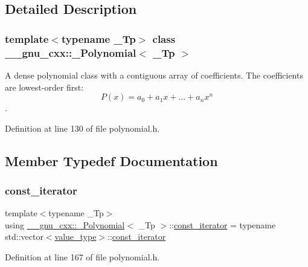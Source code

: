 \subsection{Detailed Description}
\subsubsection*{template$<$typename \+\_\+\+Tp$>$\newline
class \+\_\+\+\_\+gnu\+\_\+cxx\+::\+\_\+\+Polynomial$<$ \+\_\+\+Tp $>$}

A dense polynomial class with a contiguous array of coefficients. The coefficients are lowest-\/order first\+: \[ P(x) = a_0 + a_1 x + ... + a_n x^n \]. 

Definition at line 130 of file polynomial.\+h.



\subsection{Member Typedef Documentation}
\mbox{\label{class____gnu__cxx_1_1__Polynomial_a96e4523cc2a834724fe4224f0800486b}} 
\subsubsection{\texorpdfstring{const\+\_\+iterator}{const\_iterator}}
{\footnotesize\ttfamily template$<$typename \+\_\+\+Tp$>$ \\
using \hyperlink{class____gnu__cxx_1_1__Polynomial}{\+\_\+\+\_\+gnu\+\_\+cxx\+::\+\_\+\+Polynomial}$<$ \+\_\+\+Tp $>$\+::\hyperlink{class____gnu__cxx_1_1__Polynomial_a96e4523cc2a834724fe4224f0800486b}{const\+\_\+iterator} =  typename std\+::vector$<$\hyperlink{class____gnu__cxx_1_1__Polynomial_a725563351f50e76084a7a016c06f8a53}{value\+\_\+type}$>$\+::\hyperlink{class____gnu__cxx_1_1__Polynomial_a96e4523cc2a834724fe4224f0800486b}{const\+\_\+iterator}}



Definition at line 167 of file polynomial.\+h.

\mbox{\label{class____gnu__cxx_1_1__Polynomial_aaf4c4bbd516b837df5fe70b3bda4e9af}} 
